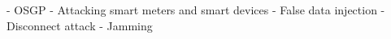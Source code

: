 - OSGP
- Attacking smart meters and smart devices
- False data injection
- Disconnect attack
- Jamming